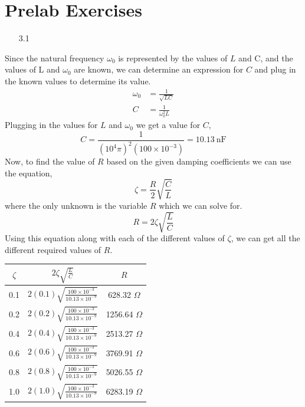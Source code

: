 \documentclass[12pt]{article}
\begin{document}
    \section*{Prelab Exercises}
    \begin{itemize}
        \item[3.1]
    \end{itemize}
    \par Since the natural frequency $ \omega_0 $ is represented by the values of $ L $ and C, and the values of L and $ \omega_0 $ are known, we can determine an expression for $ C $ and plug in the known values to determine its value.
    \begin{align*}
        \omega_0 &= \frac{1}{\sqrt{LC}} \\
        C &= \frac{1}{\omega_0^2 L}
    \end{align*}
    Plugging in the values for $ L $ and $ \omega_0 $ we get a value for $ C $,
    \[
        C = \frac{1}{(10^{4} \pi)^2(100 \times 10^{-3})} = \boxed{10.13\ \text{nF}}
    \]
    Now, to find the value of $ R $ based on the given damping coefficients we can use the equation,
    \[
        \zeta = \frac{R}{2} \sqrt{\frac{C}{L}}
    \]
    where the only unknown is the variable $ R $ which we can solve for.
    \[
        R = 2 \zeta \sqrt{\frac{L}{C}}
    \]
    Using this equation along with each of the different values of $ \zeta $, we can get all the different required values of $ R $.
    \begin{table}[h]
        \centering
        \begin{tabular}{ccc}
            \toprule
            $ \zeta $ & $ 2 \zeta \sqrt{\frac{L}{C}} $ & $ R $ \\
            \midrule
            0.1 & $ 2 (0.1) \sqrt{\frac{100 \times 10^{-3}}{10.13 \times 10^{-9}}} $ & 628.32 $ \Omega $ \\
            0.2 & $ 2 (0.2) \sqrt{\frac{100 \times 10^{-3}}{10.13 \times 10^{-9}}} $ & 1256.64 $ \Omega $ \\
            0.4 & $ 2 (0.4) \sqrt{\frac{100 \times 10^{-3}}{10.13 \times 10^{-9}}} $ & 2513.27 $ \Omega $ \\
            0.6 & $ 2 (0.6) \sqrt{\frac{100 \times 10^{-3}}{10.13 \times 10^{-9}}} $ & 3769.91 $ \Omega $ \\
            0.8 & $ 2 (0.8) \sqrt{\frac{100 \times 10^{-3}}{10.13 \times 10^{-9}}} $ & 5026.55 $ \Omega $ \\
            1.0 & $ 2 (1.0) \sqrt{\frac{100 \times 10^{-3}}{10.13 \times 10^{-9}}} $ & 6283.19 $ \Omega $ \\
            \bottomrule
        \end{tabular}
    \end{table}
\end{document}
